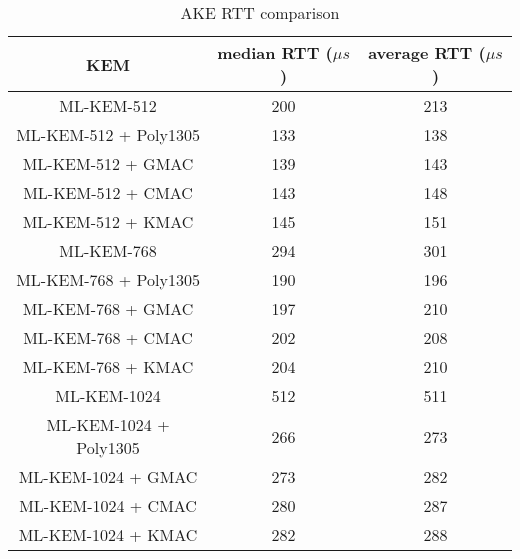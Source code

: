 \documentclass[floatrow,journal=tches,submission]{iacrtrans}
\newcommand{\us}{\mu s}
\begin{document}
\begin{table}[H]
    \caption{AKE RTT comparison}\label{tbl:ake-rtt}
    \begin{tabular}{|c|c|c|}
        \hline
        KEM & median RTT ($\us$) & average RTT ($\us$) \\
        \hline
        ML-KEM-512 & 200 & 213 \\
        \hline
        ML-KEM-512 + Poly1305 & 133 & 138 \\
        \hline
        ML-KEM-512 + GMAC & 139 & 143 \\
        \hline
        ML-KEM-512 + CMAC & 143 & 148 \\
        \hline
        ML-KEM-512 + KMAC & 145 & 151 \\
        \hline 
        ML-KEM-768 & 294 & 301 \\
        \hline
        ML-KEM-768 + Poly1305 & 190 & 196 \\
        \hline
        ML-KEM-768 + GMAC & 197 & 210 \\
        \hline
        ML-KEM-768 + CMAC & 202 & 208 \\
        \hline
        ML-KEM-768 + KMAC & 204 & 210 \\
        \hline
        ML-KEM-1024 & 512 & 511 \\
        \hline
        ML-KEM-1024 + Poly1305 & 266 & 273 \\
        \hline
        ML-KEM-1024 + GMAC & 273 & 282 \\
        \hline
        ML-KEM-1024 + CMAC & 280 & 287 \\
        \hline
        ML-KEM-1024 + KMAC & 282 & 288 \\
        \hline
    \end{tabular}
\end{table}
\end{document}
